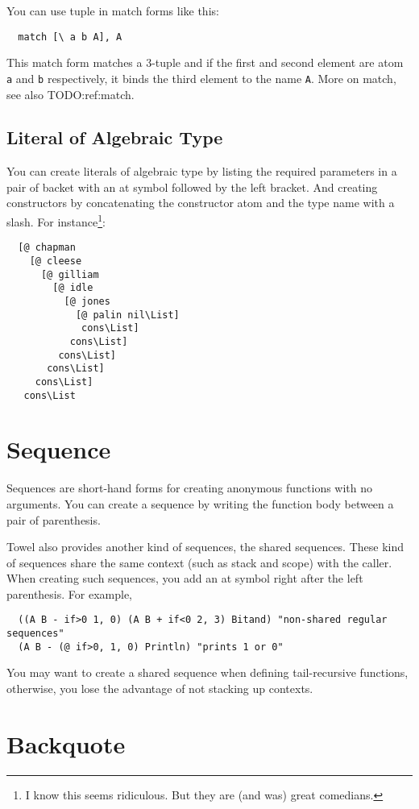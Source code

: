 \documentclass{book}
\begin{document}
You can use tuple in match forms like this:
\begin{verbatim}
  match [\ a b A], A
\end{verbatim}
This match form matches a 3-tuple and if the first and second element are atom \texttt{a} and \texttt{b} respectively, it binds the third element to the name \texttt{A}. More on match, see also TODO:ref:match.

\subsection{Literal of Algebraic Type}

You can create literals of algebraic type by listing the required parameters in a pair of backet with an at symbol followed by the left bracket. And creating constructors by concatenating the constructor atom and the type name with a slash. For instance\footnote{I know this seems ridiculous. But they are (and was) great comedians.}:
\begin{verbatim}
  [@ chapman
    [@ cleese
      [@ gilliam
        [@ idle
          [@ jones
            [@ palin nil\List]
             cons\List]
           cons\List]
         cons\List]
       cons\List]
     cons\List]
   cons\List
\end{verbatim}

\section{Sequence}

Sequences are short-hand forms for creating anonymous functions with no arguments. You can create a sequence by writing the function body between a pair of parenthesis.

Towel also provides another kind of sequences, the shared sequences. These kind of sequences share the same context (such as stack and scope) with the caller. When creating such sequences, you add an at symbol right after the left parenthesis. For example,
\begin{verbatim}
  ((A B - if>0 1, 0) (A B + if<0 2, 3) Bitand) "non-shared regular sequences"
  (A B - (@ if>0, 1, 0) Println) "prints 1 or 0"
\end{verbatim}

You may want to create a shared sequence when defining tail-recursive functions, otherwise, you lose the advantage of not stacking up contexts.

\section{Backquote}
\end{document}
